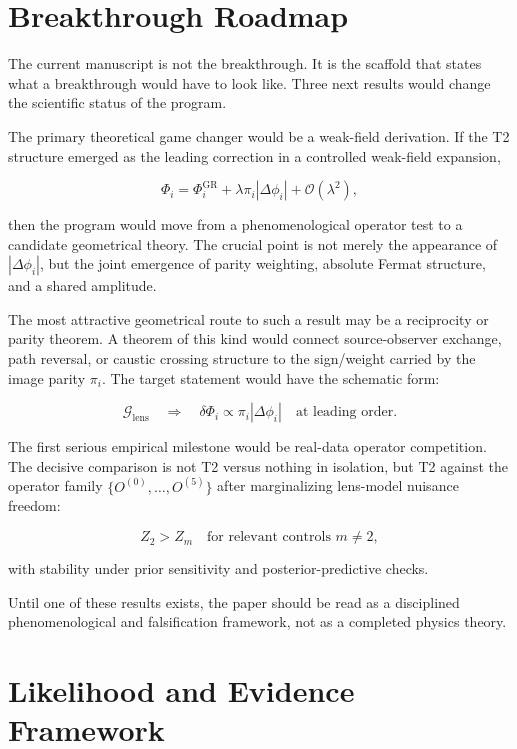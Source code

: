 \documentclass[11pt]{article}
\begin{document}
\section{Breakthrough Roadmap}\label{breakthrough-roadmap}

The current manuscript is not the breakthrough. It is the scaffold that
states what a breakthrough would have to look like. Three next results
would change the scientific status of the program.

The primary theoretical game changer would be a weak-field derivation.
If the T2 structure emerged as the leading correction in a controlled
weak-field expansion,

\[
\Phi_i =
\Phi_i^\mathrm{GR}
+ \lambda \pi_i|\Delta\phi_i|
+ \mathcal{O}(\lambda^2),
\]

then the program would move from a phenomenological operator test to a
candidate geometrical theory. The crucial point is not merely the
appearance of \(|\Delta\phi_i|\), but the joint emergence of parity
weighting, absolute Fermat structure, and a shared amplitude.

The most attractive geometrical route to such a result may be a
reciprocity or parity theorem. A theorem of this kind would connect
source-observer exchange, path reversal, or caustic crossing structure
to the sign/weight carried by the image parity \(\pi_i\). The target
statement would have the schematic form:

\[
\mathcal{G}_\mathrm{lens}
\quad \Longrightarrow \quad
\delta \Phi_i \propto \pi_i |\Delta \phi_i|
\quad
\text{at leading order}.
\]

The first serious empirical milestone would be real-data operator
competition. The decisive comparison is not T2 versus nothing in
isolation, but T2 against the operator family
\(\{O^{(0)},\ldots,O^{(5)}\}\) after marginalizing lens-model nuisance
freedom:

\[
Z_2 > Z_m
\quad \text{for relevant controls } m \ne 2,
\]

with stability under prior sensitivity and posterior-predictive checks.

Until one of these results exists, the paper should be read as a
disciplined phenomenological and falsification framework, not as a
completed physics theory.

\section{Likelihood and Evidence
Framework}\label{likelihood-and-evidence-framework}
\end{document}
